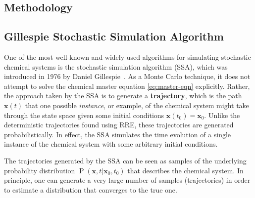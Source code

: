 \documentclass[english,letterpaper,12pt]{report}
\newcommand{\defkeywd}[1]{\textbf{#1}}
\renewcommand{\vec}[1]{\ensuremath{\mathbf{#1}}}
\DeclareMathOperator{\Prob}{P}
\begin{document}
\begin{doublespacing}


\chapter{Methodology} %
\label{sec:methodology}

\section{Gillespie Stochastic Simulation Algorithm} %
\label{sub:gillespie-ssa}

One of the most well-known and widely used  algorithms for simulating stochastic chemical systems is the stochastic simulation algorithm (SSA), which was introduced in 1976 by Daniel Gillespie~\cite{gillespie-1976}. As a Monte Carlo technique, it does not attempt to solve the chemical master equation \eqref{eq:master-eqn} explicitly. Rather, the approach taken by the SSA is to generate a \defkeywd{trajectory}, which is the path $\vec{x}(t)$ that one possible \emph{instance}, or example, of the chemical system might take through the state space given some initial conditions $\vec{x}(t_0) = \vec{x}_0$. Unlike the deterministic trajectories found using RRE, these trajectories are generated probabilistically. In effect, the SSA simulates the time evolution of a single instance of the chemical system with some arbitrary initial conditions.

The trajectories generated by the SSA can be seen as samples of the underlying probability distribution $\Prob(\vec{x}, t | \vec{x}_0, t_0)$ that describes the chemical system. In principle, one can generate a very large number of samples (trajectories) in order to estimate a distribution that converges to the true one.


\end{doublespacing}
\end{document}
